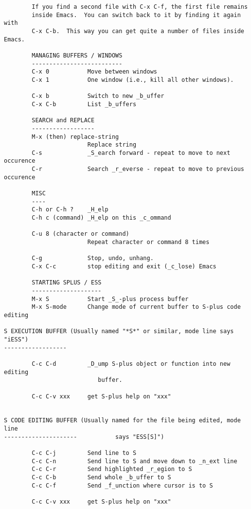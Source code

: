 \documentclass{article}
\begin{document}
\begin{verbatim}
        If you find a second file with C-x C-f, the first file remains
        inside Emacs.  You can switch back to it by finding it again with
        C-x C-b.  This way you can get quite a number of files inside Emacs.

        MANAGING BUFFERS / WINDOWS
        --------------------------
        C-x 0           Move between windows 
        C-x 1           One window (i.e., kill all other windows).

        C-x b           Switch to new _b_uffer
        C-x C-b         List _b_uffers

        SEARCH and REPLACE
        ------------------
        M-x (then) replace-string
                        Replace string
        C-s             _S_earch forward - repeat to move to next occurence
        C-r             Search _r_everse - repeat to move to previous occurence
                        
        MISC
        ----
        C-h or C-h ?    _H_elp
        C-h c (command) _H_elp on this _c_ommand

        C-u 8 (character or command)   
                        Repeat character or command 8 times

        C-g             Stop, undo, unhang.
        C-x C-c         stop editing and exit (_c_lose) Emacs  

        STARTING SPLUS / ESS
        --------------------
        M-x S           Start _S_-plus process buffer
        M-x S-mode      Change mode of current buffer to S-plus code editing

S EXECUTION BUFFER (Usually named "*S*" or similar, mode line says "iESS")
------------------

        C-c C-d         _D_ump S-plus object or function into new editing 
                           buffer.

        C-c C-v xxx     get S-plus help on "xxx"


S CODE EDITING BUFFER (Usually named for the file being edited, mode line 
---------------------           says "ESS[S]")

        C-c C-j         Send line to S
        C-c C-n         Send line to S and move down to _n_ext line
        C-c C-r         Send highlighted _r_egion to S
        C-c C-b         Send whole _b_uffer to S
        C-c C-f         Send _f_unction where cursor is to S

        C-c C-v xxx     get S-plus help on "xxx"
\end{verbatim}
\end{document}
